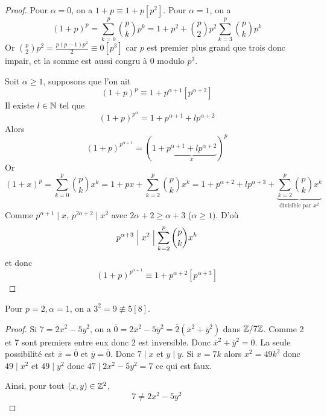 \begin{proof}
	Pour $\alpha=0$, on a $1+p\equiv 1+p[p^{2}]$. Pour $\alpha=1$, on a 
	\begin{equation}
		(1+p)^{p}=\sum_{k=0}^{p}\binom{p}{k}p^{k}=1+p^{2}+\binom{p}{2}p^{2}\sum_{k=3}^{p}\binom{p}{k}p^{k}
	\end{equation}
	Or $\binom{p}{2}p^{2}=\frac{p(p-1)p^{2}}{2}\equiv0[p^{3}]$ car $p$ est premier plus grand que trois donc impair, et la somme est aussi congru à 0 modulo $p^{3}$.

	Soit $\alpha\geqslant1$, supposons que l'on ait 
	\begin{equation}
		(1+p)^{p}\equiv 1+p^{\alpha+1}[p^{\alpha+2}]
	\end{equation}
	Il existe $l\in\mathbb{N}$ tel que 
	\begin{equation}
		(1+p)^{p^{\alpha}}=1+p^{\alpha+1}+lp^{\alpha+2}
	\end{equation}
	Alors 
	\begin{equation}
		(1+p)^{p^{\alpha+1}}=(1+\underbrace{p^{\alpha+1}+lp^{\alpha+2}}_{x})^{p}
	\end{equation}
	Or
	\begin{equation}
		(1+x)^{p}=\sum_{k=0}^{p}\binom{p}{k}x^{k}=1+px+\sum_{k=2}^{p}\binom{p}{k}x^{k}=1+p^{\alpha+2}+lp^{\alpha+3}+\underbrace{\sum_{k=2}^{p}\binom{p}{k}x^{k}}_{\text{divisible par }x^{2}}
	\end{equation}
	Comme $p^{\alpha+1}\mid x$, $p^{2\alpha+2}\mid x^{2}$ avec $2\alpha+2\geqslant\alpha+3$ ($\alpha\geqslant1)$. D'où 
	\begin{equation}
		p^{\alpha+3}\Bigm| x^{2}\Bigm|\sum_{k=2}^{p}\binom{p}{k}x^{k}
	\end{equation}
	et donc
	\begin{equation}
		\boxed{(1+p)^{p^{\alpha+1}}\equiv1+p^{\alpha+2}[p^{\alpha+3}]}
	\end{equation}
\end{proof}

\begin{remark}
	Pour $p=2,\alpha=1$, on a $3^{2}=9\not\equiv 5[8]$.
\end{remark}

\begin{proof}
	Si $7=2x^{2}-5y^{2}$, on a $\overline{0}=2\overline{x}^{2}-5\overline{y}^{2}=\overline{2}(\overline{x}^{2}+\overline{y}^{2})$ dans $\mathbb{Z}/7\mathbb{Z}$. Comme 2 et 7 sont premiers entre eux donc $\overline{2}$ est inversible. Donc $\overline{x}^{2}+\overline{y}^{2}=\overline{0}$. La seule possibilité est $\overline{x}=\overline{0}$ et $\overline{y}=\overline{0}$. Donc $7\mid x$ et $y\mid y$. Si $x=7k$ alors $x^{2}=49k^{2}$ donc $49\mid x^{2}$ et $49\mid y^{2}$ donc $47\mid 2x^{2}-5y^{2}=7$ ce qui est faux. 

	Ainsi, pour tout $(x,y)\in\mathbb{Z}^{2}$,
	\begin{equation}
		\boxed{7\neq2x^{2}-5y^{2}}
	\end{equation}
\end{proof}

